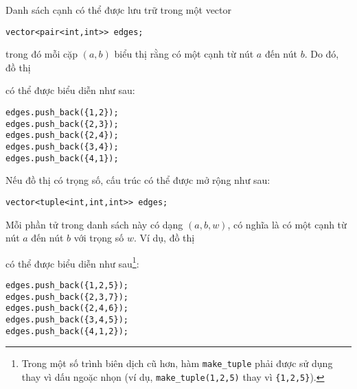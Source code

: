 Danh sách cạnh có thể được lưu trữ trong một vector
\begin{lstlisting}
vector<pair<int,int>> edges;
\end{lstlisting}
trong đó mỗi cặp $(a,b)$ biểu thị rằng
có một cạnh từ nút $a$ đến nút $b$.
Do đó, đồ thị

\begin{center}
\end{center}
có thể được biểu diễn như sau:
\begin{lstlisting}
edges.push_back({1,2});
edges.push_back({2,3});
edges.push_back({2,4});
edges.push_back({3,4});
edges.push_back({4,1});
\end{lstlisting}

\noindent
Nếu đồ thị có trọng số, cấu trúc có thể
được mở rộng như sau:
\begin{lstlisting}
vector<tuple<int,int,int>> edges;
\end{lstlisting}
Mỗi phần tử trong danh sách này có dạng
$(a,b,w)$, có nghĩa là có
một cạnh từ nút $a$ đến nút $b$ với trọng số $w$.
Ví dụ, đồ thị

\begin{center}
\end{center}
\begin{samepage}
có thể được biểu diễn như sau\footnote{Trong một số trình biên dịch cũ hơn, hàm
\texttt{make\_tuple} phải được sử dụng thay vì dấu ngoặc nhọn (ví dụ,
\texttt{make\_tuple(1,2,5)} thay vì \texttt{\{1,2,5\}}).}:
\begin{lstlisting}
edges.push_back({1,2,5});
edges.push_back({2,3,7});
edges.push_back({2,4,6});
edges.push_back({3,4,5});
edges.push_back({4,1,2});
\end{lstlisting}
\end{samepage}
